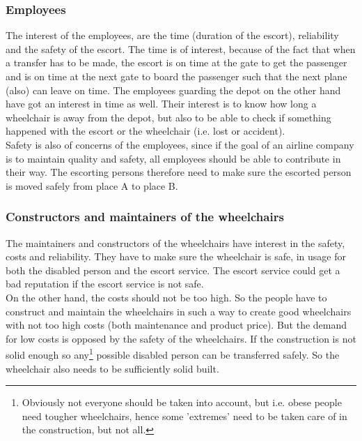 \documentclass[a4paper, 11pt, notitlepage]{report}
\begin{document}
\subsubsection{Employees}
The interest of the employees, are the time (duration of the escort), reliability and the safety of the escort. The time is of interest, because of the fact that when a transfer has to be made, the escort is on time at the gate to get the passenger and is on time at the next gate to board the passenger such that the next plane (also) can leave on time. The employees guarding the depot on the other hand have got an interest in time as well. Their interest is to know how long a wheelchair is away from the depot, but also to be able to check if something happened with the escort or the wheelchair (i.e. lost or accident). \\
Safety is also of concerns of the employees, since if the goal of an airline company is to maintain quality and safety, all employees should be able to contribute in their way. The escorting persons therefore need to make sure the escorted person is moved safely from place A to place B.
\subsubsection{Constructors and maintainers of the wheelchairs}
The maintainers and constructors of the wheelchairs have interest in the safety, costs and reliability. They have to make sure the wheelchair is safe,  in usage for both the disabled person and the escort service. The escort service could get a bad reputation if the escort service is not safe.\\
On the other hand, the costs should not be too high. So the people have to construct and maintain the wheelchairs in such a way to create good wheelchairs with not too high costs (both maintenance and product price). But the demand for low costs is opposed by the safety of the wheelchairs. If the construction is not solid enough so any\footnote{Obviously not everyone should be taken into account, but i.e. obese people need tougher wheelchairs, hence some 'extremes' need to be taken care of in the construction, but not all.} possible disabled person can be transferred safely. So the wheelchair also needs to be sufficiently solid built.
\end{document}
